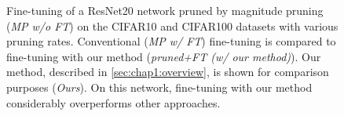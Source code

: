 \begin{figure}
  \centering
  \caption{ Fine-tuning of a ResNet20 network pruned by magnitude pruning
    (\emph{MP w/o FT}) on the CIFAR10 and CIFAR100 datasets with various pruning
    rates. Conventional (\emph{MP w/ FT}) fine-tuning is compared to fine-tuning
    with our method (\emph{pruned+FT (w/ our method)}). Our method, described in
    \cref{sec:chap1:overview}, is shown for comparison purposes (\emph{Ours}). On
    this network, fine-tuning with our method considerably overperforms other
    approaches.}
  \label{fig:chap1:finetuning_impact_resnet20}
\end{figure}


